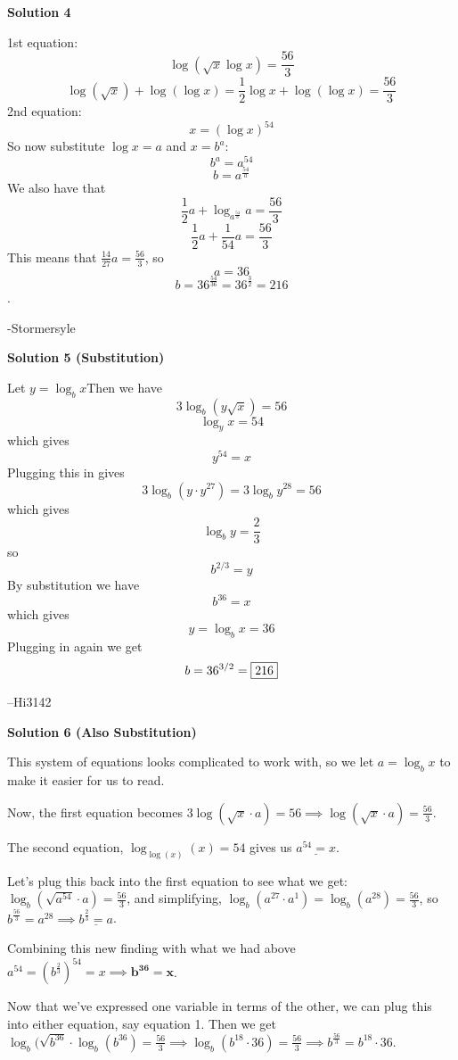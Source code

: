 \begin{enumerate}
\textbf{Solution 4}

1st equation: 
 \[\log (\sqrt{x}\log x)=\frac{56}{3}\] 
 \[\log(\sqrt x)+\log(\log x)=\frac{1}{2}\log x+\log(\log x)=\frac{56}{3}\] 2nd equation: 
 \[x=(\log x)^{54}\] So now substitute $\log x=a$ and $x=b^a$: 
 \[b^a=a^{54}\] 
 \[b=a^{\frac{54}{a}}\] We also have that 
 \[\frac{1}{2}a+\log_{a^\frac{54}{a}} a=\frac{56}{3}\] 
 \[\frac{1}{2}a+\frac{1}{54}a=\frac{56}{3}\] This means that $\frac{14}{27}a=\frac{56}{3}$, so 
 \[a=36\] 
 \[b=36^{\frac{54}{36}}=36^\frac{3}{2}=\boxed{216}\].

 -Stormersyle

 



\textbf{Solution 5 (Substitution)}

Let $y = \log _{b} x$Then we have
 \[3\log _{b} (y\sqrt{x}) = 56\]
 \[\log _{y} x = 54\]which gives
 \[y^{54} = x\]Plugging this in gives
 \[3\log _{b} (y \cdot y^{27}) = 3\log _{b} y^{28} = 56\]which gives
 \[\log _{b} y = \dfrac{2}{3}\]so
 \[b^{2/3} = y\]By substitution we have
 \[b^{36} = x\]which gives
 \[y = \log _{b} x = 36\]Plugging in again we get
 \[b = 36^{3/2} = \fbox{216}\]

 --Hi3142

 



\textbf{Solution 6 (Also Substitution)}

This system of equations looks complicated to work with, so we let $a=\log_bx$ to make it easier for us to read. 

 Now, the first equation becomes $3\log(\sqrt x \cdot a) = 56 \implies \log(\sqrt{x}\cdot a)=\frac{56}3$. 

 The second equation, $\log_{\log(x)}(x)=54$ gives us $\underline{a^{54} = x}$.

 Let's plug this back into the first equation to see what we get: $\log_b(\sqrt{a^{54}}\cdot a)=\frac{56}3$, and simplifying, $\log_b(a^{27}\cdot a^1)=\log_b(a^{28})=\frac{56}{3}$, so $b^{\frac{56}3}=a^{28}\implies \underline{b^{\frac 23}=a}$.

 Combining this new finding with what we had above $a^{54} = (b^{\frac 23})^{54} = x\implies \mathbf{b^{36} =x}$. 

 Now that we've expressed one variable in terms of the other, we can plug this into either equation, say equation 1. Then we get $\log_b(\sqrt{b^{36}}\cdot\log_b(b^{36})=\frac{56}3\implies$$\log_b(b^{18}\cdot 36)=\frac{56}3\implies b^{\frac{56}3}=b^{18}\cdot 36$. 


\end{enumerate}
